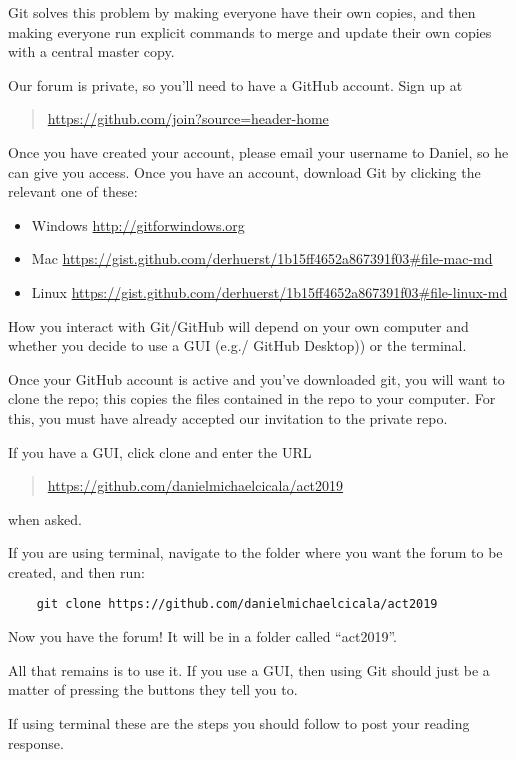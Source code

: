 \documentclass[11pt, oneside]{article}
\begin{document}
Git solves this problem by making everyone have their own
copies, and then making everyone run explicit commands to
merge and update their own copies with a central master
copy.

Our forum is private, so you'll need to have a GitHub
account. Sign up at
\begin{quote}
  \url{https://github.com/join?source=header-home}
\end{quote}
Once you have created your account, please email your
username to Daniel, so he can give you access.  Once you
have an account, download Git by clicking the relevant one
of these:
\begin{itemize}
\item  Windows \url{http://gitforwindows.org}
\item  Mac  \url{https://gist.github.com/derhuerst/1b15ff4652a867391f03#file-mac-md}
\item Linux  \url{https://gist.github.com/derhuerst/1b15ff4652a867391f03#file-linux-md}
\end{itemize}

How you interact with Git/GitHub will depend on your own
computer and whether you decide to use a GUI (e.g./ GitHub
Desktop)) or the terminal. 

Once your GitHub account is active and you've downloaded
git, you will want to clone the repo; this copies the files
contained in the repo to your computer. For this, you must
have already accepted our invitation to the private repo.

If you have a GUI, click clone and enter the URL
\begin{quote}
  \url{https://github.com/danielmichaelcicala/act2019}
\end{quote}
when asked.

If you are using terminal, navigate to the folder where you
want the forum to be created, and then run:

\begin{verbatim}
    git clone https://github.com/danielmichaelcicala/act2019
\end{verbatim}

Now you have the forum! It will be in a folder called
``act2019''.

All that remains is to use it. If you use a GUI, then using
Git should just be a matter of pressing the buttons they
tell you to.

If using terminal these are the steps you should follow to
post your reading response.
\end{document}
